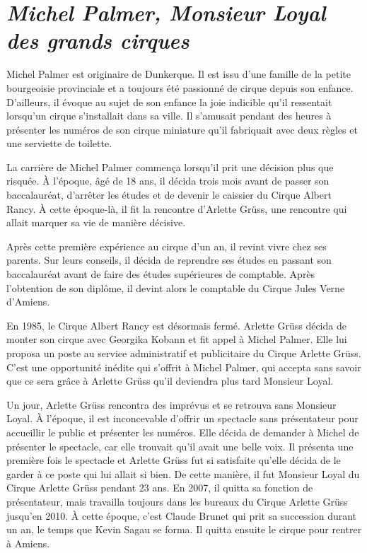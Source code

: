 \section*{\textit{Michel Palmer, Monsieur Loyal des grands cirques}}
{}

Michel Palmer est originaire de Dunkerque. Il est issu d’une famille de la petite bourgeoisie provinciale et a toujours été passionné de cirque depuis son enfance. D’ailleurs, il évoque au sujet de son enfance la joie indicible qu’il ressentait lorsqu’un cirque s’installait dans sa ville. Il s’amusait pendant des heures à présenter les numéros de son cirque miniature qu’il fabriquait avec deux règles et une serviette de toilette.

La carrière de Michel Palmer commença lorsqu’il prit une décision plus que risquée. À l’époque, âgé de 18 ans, il décida trois mois avant de passer son baccalauréat, d’arrêter les études et de devenir le caissier du Cirque Albert Rancy. À cette époque-là, il fit la rencontre d’Arlette Grüss, une rencontre qui allait marquer sa vie de manière décisive.

Après cette première expérience au cirque d’un an, il revint vivre chez ses parents. Sur leurs conseils, il décida de reprendre ses études en passant son baccalauréat avant de faire des études supérieures de comptable. Après l’obtention de son diplôme, il devint alors le comptable du Cirque Jules Verne d’Amiens.

En 1985, le Cirque Albert Rancy est désormais fermé. Arlette Grüss décida de monter son cirque avec Georgika Kobann et fit appel à Michel Palmer. Elle lui proposa un poste au service administratif et publicitaire du Cirque Arlette Grüss. C’est une opportunité inédite qui s’offrit à Michel Palmer, qui accepta sans savoir que ce sera grâce à Arlette Grüss qu’il deviendra plus tard Monsieur Loyal.

Un jour, Arlette Grüss rencontra des imprévus et se retrouva sans Monsieur Loyal. À l’époque, il est inconcevable d’offrir un spectacle sans présentateur pour accueillir le public et présenter les numéros. Elle décida de demander à Michel de présenter le spectacle, car elle trouvait qu’il avait une belle voix. Il présenta une première fois le spectacle et Arlette Grüss fut si satisfaite qu’elle décida de le garder à ce poste qui lui allait si bien. De cette manière, il fut Monsieur Loyal du Cirque Arlette Grüss pendant 23 ans. En 2007, il quitta sa fonction de présentateur, mais travailla toujours dans les bureaux du Cirque Arlette Grüss jusqu’en 2010. À cette époque, c’est Claude Brunet qui prit sa succession durant un an, le temps que Kevin Sagau se forma. Il quitta ensuite le cirque pour rentrer à Amiens.

